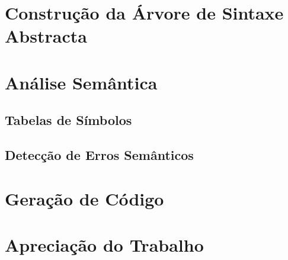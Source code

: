 \documentclass[11pt,a4paper]{article}
\begin{document}
\section{Construção da Árvore de Sintaxe Abstracta}

\pagebreak

\section{Análise Semântica}

	\subsection{Tabelas de Símbolos}
	
\pagebreak
	
	\subsection{Detecção de Erros Semânticos}
	
\pagebreak
	
\section{Geração de Código}

\pagebreak

\section{Apreciação do Trabalho}
\end{document}
